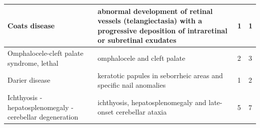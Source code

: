 \documentclass[10pt,letterpaper,final]{article}
\begin{document}
\begin{center}
\begin{small}
\begin{tabular}{|p{3.5cm}|p{6cm}|p{1.8cm}|p{1.8cm}|}
    \hline
    Coats disease & abnormal development of retinal vessels (telangiectasia) with a progressive deposition of intraretinal or subretinal exudates & 1 & 1\\
    \hline
    Omphalocele-cleft palate syndrome, lethal & omphalocele and cleft palate & 2 & 3\\
    \hline
    Darier disease & keratotic papules in seborrheic areas and specific nail anomalies & 1 & 2\\
    \hline
    Ichthyosis - hepatosplenomegaly - cerebellar degeneration & ichthyosis, hepatosplenomegaly and late-onset cerebellar ataxia & 5 & 7\\
    \hline
    \end{tabular}
\label{tab:results_orphanet}
\end{small}
\end{center}
\end{document}
